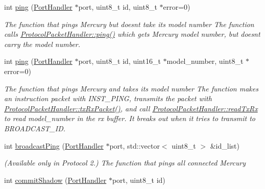 \begin{DoxyCompactItemize}
int \hyperlink{classmercury_1_1_protocol_packet_handler_a6a34fbd6bd9cbcedf87e5c8341be7ca0}{ping} (\hyperlink{classmercury_1_1_port_handler}{Port\+Handler} $\ast$port, uint8\+\_\+t id, uint8\+\_\+t $\ast$error=0)
\begin{DoxyCompactList}\small\item\em The function that pings Mercury but doesn\textquotesingle{}t take its model number  The function calls \hyperlink{classmercury_1_1_protocol_packet_handler_a6a34fbd6bd9cbcedf87e5c8341be7ca0}{Protocol\+Packet\+Handler\+::ping()} which gets Mercury model number,  but doesn\textquotesingle{}t carry the model number. \end{DoxyCompactList}\item 
int \hyperlink{classmercury_1_1_protocol_packet_handler_a5096f7bcb97faf46ed7b363c509283a6}{ping} (\hyperlink{classmercury_1_1_port_handler}{Port\+Handler} $\ast$port, uint8\+\_\+t id, uint16\+\_\+t $\ast$model\+\_\+number, uint8\+\_\+t $\ast$error=0)
\begin{DoxyCompactList}\small\item\em The function that pings Mercury and takes its model number  The function makes an instruction packet with I\+N\+S\+T\+\_\+\+P\+I\+NG,  transmits the packet with \hyperlink{classmercury_1_1_protocol_packet_handler_a68b02f23af616886d0795ea12debd613}{Protocol\+Packet\+Handler\+::tx\+Rx\+Packet()},  and call \hyperlink{classmercury_1_1_protocol_packet_handler_a368325ca9c0c783b1e88ef32a4544e51}{Protocol\+Packet\+Handler\+::read\+Tx\+Rx} to read model\+\_\+number in the rx buffer.  It breaks out  when it tries to transmit to B\+R\+O\+A\+D\+C\+A\+S\+T\+\_\+\+ID. \end{DoxyCompactList}\item 
int \hyperlink{classmercury_1_1_protocol_packet_handler_a3cbeb97b8a4a955180a54255a0931d2d}{broadcast\+Ping} (\hyperlink{classmercury_1_1_port_handler}{Port\+Handler} $\ast$port, std\+::vector$<$ uint8\+\_\+t $>$ \&id\+\_\+list)
\begin{DoxyCompactList}\small\item\em (Available only in Protocol 2.) The function that pings all connected Mercury \end{DoxyCompactList}\item 
int \hyperlink{classmercury_1_1_protocol_packet_handler_aeb249dda7388331a21d7f765923dbd62}{commit\+Shadow} (\hyperlink{classmercury_1_1_port_handler}{Port\+Handler} $\ast$port, uint8\+\_\+t id)

\end{DoxyCompactItemize}
